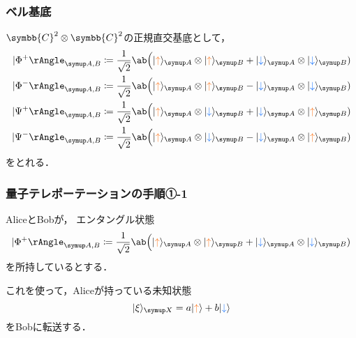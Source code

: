 \documentclass[
    10pt,
    ]{sotsu-beamer}
\newcommand{\bitone}{\mathcolor{fire}{\uparrow}}
\newcommand{\bittwo}{\mathcolor{water}{\downarrow}}
\begin{document}
\begin{frame}
    \frametitle{ベル基底}

    $\symbb{C}^2 \otimes \symbb{C}^2$の正規直交基底として，
        \begin{align*}
            \Ket{\Phi^+}<A,B> 
                &\coloneq \frac{1}{\sqrt{2}}
                    \ab\Big( \ket{\bitone}<A> \otimes \ket{\bitone}<B> + \ket{\bittwo}<A> \otimes \ket{\bittwo}<B> )
            \\
            \Ket{\Phi^-}<A,B> 
                &\coloneq \frac{1}{\sqrt{2}}
                    \ab\Big( \ket{\bitone}<A> \otimes \ket{\bitone}<B> - \ket{\bittwo}<A> \otimes \ket{\bittwo}<B> )
            \\
            \Ket{\Psi^+}<A,B> 
                &\coloneq \frac{1}{\sqrt{2}}
                    \ab\Big( \ket{\bitone}<A> \otimes \ket{\bittwo}<B> + \ket{\bittwo}<A> \otimes \ket{\bitone}<B> )
            \\
            \Ket{\Psi^-}<A,B> 
                &\coloneq \frac{1}{\sqrt{2}}
                    \ab\Big( \ket{\bitone}<A> \otimes \ket{\bittwo}<B> - \ket{\bittwo}<A> \otimes \ket{\bitone}<B> )
        \end{align*}
        をとれる．

\end{frame}


\begin{frame}
    \frametitle{量子テレポーテーションの手順①-1}

    AliceとBobが，
    エンタングル状態
    \begin{equation*}
        \Ket{\Phi^+}<A,B> 
        \coloneq \frac{1}{\sqrt{2}}
        \ab\Big( \ket{\bitone}<A> \otimes \ket{\bitone}<B> + \ket{\bittwo}<A> \otimes \ket{\bittwo}<B> )
    \end{equation*}
    を所持しているとする．

    これを使って，Aliceが持っている未知状態
    \begin{equation*}
        \ket{\xi}<X> = a \ket{\bitone} + b \ket{\bittwo}
    \end{equation*}
    をBobに転送する．

\end{frame}
\end{document}
